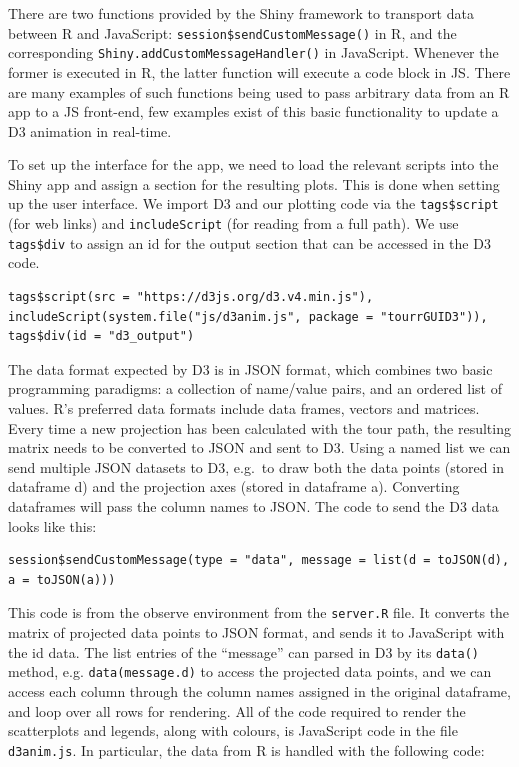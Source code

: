There are two functions provided by the Shiny framework to transport
data between R and JavaScript: \texttt{session\$sendCustomMessage()} in
R, and the corresponding \texttt{Shiny.addCustomMessageHandler()} in
JavaScript. Whenever the former is executed in R, the latter function
will execute a code block in JS. There are many examples of such
functions being used to pass arbitrary data from an R app to a JS
front-end, few examples exist of this basic functionality to update a D3
animation in real-time.

To set up the interface for the app, we need to load the relevant
scripts into the Shiny app and assign a section for the resulting plots.
This is done when setting up the user interface. We import D3 and our
plotting code via the \texttt{tags\$script} (for web links) and
\texttt{includeScript} (for reading from a full path). We use
\texttt{tags\$div} to assign an id for the output section that can be
accessed in the D3 code.

\begin{verbatim}
tags$script(src = "https://d3js.org/d3.v4.min.js"),
includeScript(system.file("js/d3anim.js", package = "tourrGUID3")),
tags$div(id = "d3_output")
\end{verbatim}

The data format expected by D3 is in JSON format, which combines two
basic programming paradigms: a collection of name/value pairs, and an
ordered list of values. R's preferred data formats include data frames,
vectors and matrices. Every time a new projection has been calculated
with the tour path, the resulting matrix needs to be converted to JSON
and sent to D3. Using a named list we can send multiple JSON datasets to
D3, e.g.~to draw both the data points (stored in dataframe d) and the
projection axes (stored in dataframe a). Converting dataframes will pass
the column names to JSON. The code to send the D3 data looks like this:

\begin{verbatim}
session$sendCustomMessage(type = "data", message = list(d = toJSON(d), a = toJSON(a)))
\end{verbatim}

This code is from the observe environment from the \texttt{server.R}
file. It converts the matrix of projected data points to JSON format,
and sends it to JavaScript with the id data. The list entries of the
``message'' can parsed in D3 by its \texttt{data()} method, e.g.
\texttt{data(message.d)} to access the projected data points, and we can
access each column through the column names assigned in the original
dataframe, and loop over all rows for rendering. All of the code
required to render the scatterplots and legends, along with colours, is
JavaScript code in the file \texttt{d3anim.js}. In particular, the data
from R is handled with the following code:

